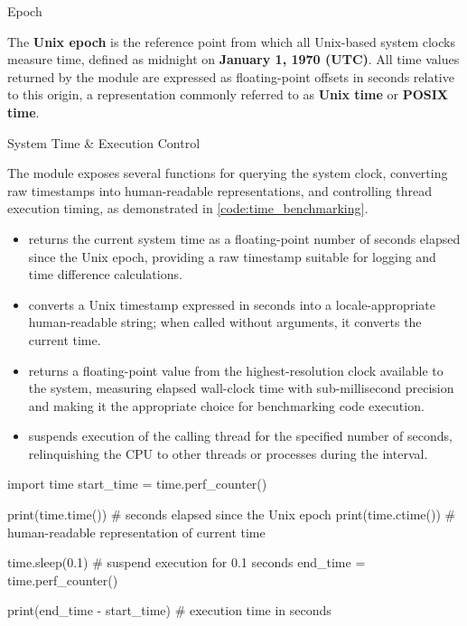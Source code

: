 \documentclass[10pt]{article}
\begin{document}
    \begin{core}{Epoch}

      The \textbf{Unix epoch} is the reference point from which all Unix-based system clocks measure time, defined as midnight on \textbf{January 1, 1970 (UTC)}. All time values returned by the  module are expressed as floating-point offsets in seconds relative to this origin, a representation commonly referred to as \textbf{Unix time} or \textbf{POSIX time}.

    \end{core}

    \begin{core}{System Time \& Execution Control}

      The  module exposes several functions for querying the system clock, converting raw timestamps into human-readable representations, and controlling thread execution timing, as demonstrated in \autoref{code:time_benchmarking}.

      \begin{itemize}

        \item {} returns the current system time as a floating-point number of seconds elapsed since the Unix epoch, providing a raw timestamp suitable for logging and time difference calculations.

        \item {} converts a Unix timestamp expressed in seconds into a locale-appropriate human-readable string; when called without arguments, it converts the current time.

        \item {} returns a floating-point value from the highest-resolution clock available to the system, measuring elapsed wall-clock time with sub-millisecond precision and making it the appropriate choice for benchmarking code execution.

        \item {} suspends execution of the calling thread for the specified number of seconds, relinquishing the CPU to other threads or processes during the interval.

      \end{itemize}

      \begin{pyconsole}

        import time
        start_time = time.perf_counter()

        print(time.time()) # seconds elapsed since the Unix epoch
        print(time.ctime()) # human-readable representation of current time

        time.sleep(0.1) # suspend execution for 0.1 seconds
        end_time = time.perf_counter()

        print(end_time - start_time) # execution time in seconds

      \end{pyconsole}

    \end{core}
\end{document}
